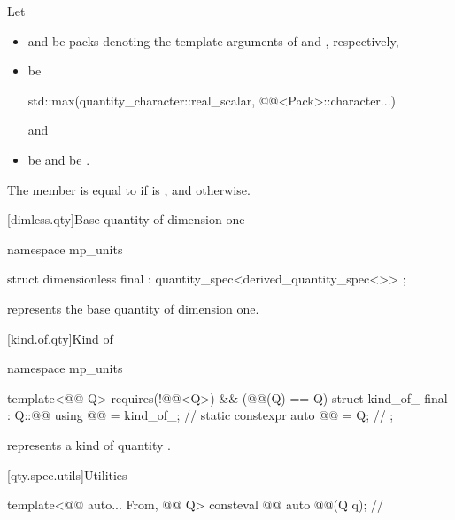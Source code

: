 \pnum
Let
\begin{itemize}
\item
{} and 
be packs denoting the template arguments of
 and , respectively,
\item
{} be
\begin{codeblock}
std::max({quantity_character::real_scalar, @@<Pack>::character...})
\end{codeblock}
and
\item
{} be  and
 be .
\end{itemize}
The member  is equal to
 if  is , and
 otherwise.

[dimless.qty]{Base quantity of dimension one}

\begin{codeblock}
namespace mp_units {

struct dimensionless final : quantity_spec<derived_quantity_spec<>> {};

}
\end{codeblock}

\pnum
{} represents the base quantity of dimension one.

[kind.of.qty]{Kind of}

\begin{codeblock}
namespace mp_units {

template<@@ Q>
  requires(!@@<Q>) && (@@(Q{}) == Q{})
struct kind_of_ final : Q::@@ {
  using @@ = kind_of_;                 // \expos
  static constexpr auto @@ = Q{};  // \expos
};

}
\end{codeblock}

\pnum
{} represents a kind of quantity .

[qty.spec.utils]{Utilities}

\begin{itemdecl}
template<@@ auto... From, @@ Q>
consteval @@ auto @@(Q q);    // \expos
\end{itemdecl}

